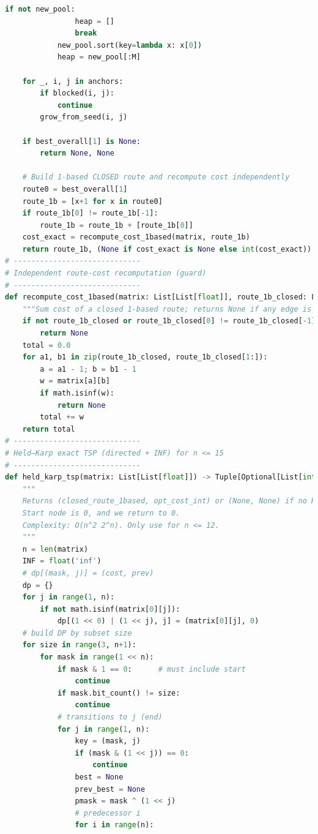 \documentclass[sn-mathphys]{article}
\theoremstyle{thmstyleone}%
\theoremstyle{thmstyletwo}%
\theoremstyle{thmstylethree}%
\begin{document}
\begin{appendices}
\begin{lstlisting}[language=Python]
            if not new_pool:
                heap = []
                break
            new_pool.sort(key=lambda x: x[0])
            heap = new_pool[:M]

    for _, i, j in anchors:
        if blocked(i, j):
            continue
        grow_from_seed(i, j)

    if best_overall[1] is None:
        return None, None

    # Build 1-based CLOSED route and recompute cost independently
    route0 = best_overall[1]
    route_1b = [x+1 for x in route0]
    if route_1b[0] != route_1b[-1]:
        route_1b = route_1b + [route_1b[0]]
    cost_exact = recompute_cost_1based(matrix, route_1b)
    return route_1b, (None if cost_exact is None else int(cost_exact))
# -----------------------------
# Independent route-cost recomputation (guard)
# -----------------------------
def recompute_cost_1based(matrix: List[List[float]], route_1b_closed: List[int]) -> Optional[float]:
    """Sum cost of a closed 1-based route; returns None if any edge is INF or invalid."""
    if not route_1b_closed or route_1b_closed[0] != route_1b_closed[-1]:
        return None
    total = 0.0
    for a1, b1 in zip(route_1b_closed, route_1b_closed[1:]):
        a = a1 - 1; b = b1 - 1
        w = matrix[a][b]
        if math.isinf(w):
            return None
        total += w
    return total
# -----------------------------
# Held–Karp exact TSP (directed + INF) for n <= 15
# -----------------------------
def held_karp_tsp(matrix: List[List[float]]) -> Tuple[Optional[List[int]], Optional[int]]:
    """
    Returns (closed_route_1based, opt_cost_int) or (None, None) if no Hamiltonian cycle exists.
    Start node is 0, and we return to 0.
    Complexity: O(n^2 2^n). Only use for n <= 12.
    """
    n = len(matrix)
    INF = float('inf')
    # dp[(mask, j)] = (cost, prev)
    dp = {}
    for j in range(1, n):
        if not math.isinf(matrix[0][j]):
            dp[(1 << 0) | (1 << j), j] = (matrix[0][j], 0)
    # build DP by subset size
    for size in range(3, n+1):
        for mask in range(1 << n):
            if mask & 1 == 0:      # must include start
                continue
            if mask.bit_count() != size:
                continue
            # transitions to j (end)
            for j in range(1, n):
                key = (mask, j)
                if (mask & (1 << j)) == 0:
                    continue
                best = None
                prev_best = None
                pmask = mask ^ (1 << j)
                # predecessor i
                for i in range(n):

\end{lstlisting}
\end{appendices}
\end{document}

